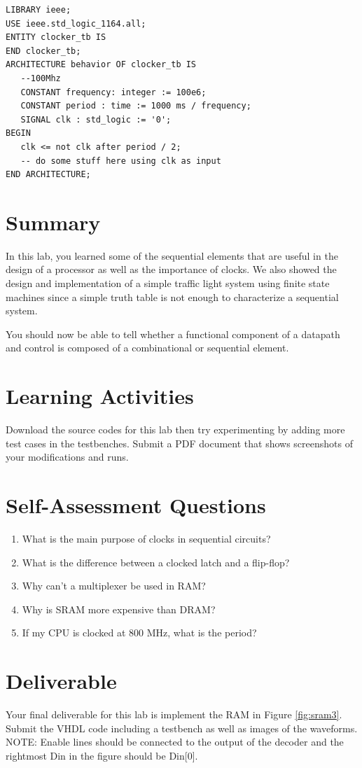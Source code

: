 \documentclass[a4paper, 11pt,oneside]{article}
\begin{document}
\begin{verbatim}
LIBRARY ieee;
USE ieee.std_logic_1164.all;
ENTITY clocker_tb IS
END clocker_tb;
ARCHITECTURE behavior OF clocker_tb IS
   --100Mhz
   CONSTANT frequency: integer := 100e6; 
   CONSTANT period : time := 1000 ms / frequency;
   SIGNAL clk : std_logic := '0';
BEGIN 
   clk <= not clk after period / 2;
   -- do some stuff here using clk as input
END ARCHITECTURE;
\end{verbatim}

\section{Summary}
In this lab, you learned some of the sequential elements that are useful in the 
design of a processor as well as the importance of clocks. We also showed the
design and implementation of a simple traffic light system using finite state 
machines since a simple truth table is not enough to characterize a sequential 
system. 

You should now be able to tell whether a functional component of a datapath and 
control is composed of a combinational or sequential element.

\section{Learning Activities}
Download the source codes for this lab then try experimenting by adding more 
test cases in the testbenches. Submit a PDF document that shows screenshots of 
your modifications and runs. 

\section{Self-Assessment Questions}
\begin{enumerate}
\item What is the main purpose of clocks in sequential circuits?
\item What is the difference between a clocked latch and a flip-flop?
\item Why can't a multiplexer be used in RAM?
\item Why is SRAM more expensive than DRAM?
\item If my CPU is clocked at 800 MHz, what is the period?
\end{enumerate}


\section{Deliverable}
Your final deliverable for this lab is implement the RAM in Figure 
 \ref{fig:sram3}. Submit the VHDL code including a testbench as well as images 
of the waveforms. NOTE: Enable lines should be connected to the output of the 
decoder and the rightmost Din in the figure should be Din[0].
\end{document}
